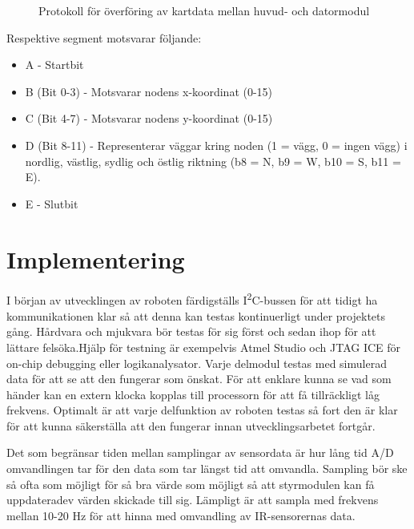 \documentclass[11pt]{article}
\begin{document}
\begin{flushleft}
 \begin{figure}[H]
\centering
\noindent\resizebox{.8\linewidth}{!}{
	}
	\caption{Protokoll för överföring av kartdata mellan huvud- och datormodul\label{kartdata}}	
\end{figure} 

Respektive segment motsvarar följande: 
\begin{itemize}
	\item A - Startbit
	\item B (Bit 0-3) - Motsvarar nodens x-koordinat (0-15)
	\item C (Bit 4-7) - Motsvarar nodens y-koordinat (0-15)
	\item D (Bit 8-11) - Representerar väggar kring noden (1 = vägg, 0 = ingen vägg) i nordlig, västlig, sydlig och östlig riktning (b8 = N, b9 = W, b10 = S, b11 = E).
	\item E - Slutbit
\end{itemize}



\pagebreak
\section{Implementering}

I början av utvecklingen av roboten färdigställs I\textsuperscript{2}C-bussen för att tidigt ha kommunikationen klar så att denna kan testas kontinuerligt under projektets gång. Hårdvara och mjukvara bör testas för sig först och sedan ihop för att lättare felsöka.Hjälp för testning är exempelvis Atmel Studio och JTAG ICE för on-chip debugging eller logikanalysator. Varje delmodul testas med simulerad data för att se att den fungerar som önskat. För att enklare kunna se vad som händer kan en extern klocka kopplas till processorn för att få tillräckligt låg frekvens. Optimalt är att varje delfunktion av roboten testas så fort den är klar för att kunna säkerställa att den fungerar innan utvecklingsarbetet fortgår. 

Det som begränsar tiden mellan samplingar av sensordata är hur lång tid A/D omvandlingen tar för den data som tar längst tid att omvandla. Sampling bör ske så ofta som möjligt för så bra värde som möjligt så att styrmodulen kan få uppdateradev värden skickade till sig. Lämpligt är att sampla med frekvens mellan 10-20 Hz för att hinna med omvandling av IR-sensorernas data. 


\pagebreak
{}



\end{flushleft}
\end{document}
